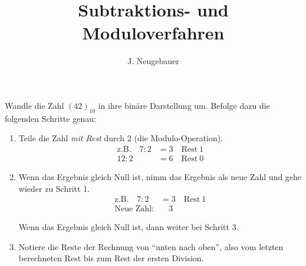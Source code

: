 \documentclass[10pt, a5paper]{scrartcl}
\author{J. Neugebauer}
\title{Subtraktions- und Moduloverfahren}
\date{\Heute}
\begin{document}
\ReiheTitel

\begin{aufgabe}
	Wandle die Zahl $(42)_{10}$ in ihre binäre Darstellung um. Befolge dazu die folgenden Schritte genau:
	\begin{enumerate}
		\item Teile die Zahl \emph{mit Rest} durch 2 (die Modulo-Operation).
			\begin{align*}
				\text{z.B.}\quad7 : 2 &= 3 \quad\text{Rest}\ 1  \\
				12 : 2 &= 6 \quad\text{Rest}\ 0
			\end{align*}
		\item Wenn das Ergebnis gleich Null ist, nimm das Ergebnis als neue Zahl und gehe wieder zu Schritt 1.
			\begin{align*}
				\text{z.B.}\quad7 : 2 &= 3 \quad\text{Rest}\ 1 \\
				\text{Neue Zahl:} &\quad 3
			\end{align*}
		
			Wenn das Ergebnis gleich Null ist, dann weiter bei Schritt 3.
		\item Notiere die Reste der Rechnung von \enquote{unten nach oben}, also vom letzten berechneten Rest bis zum Rest der ersten Division.
	\end{enumerate}
\end{aufgabe}

\newpage

\ReiheTitel
\end{document}
